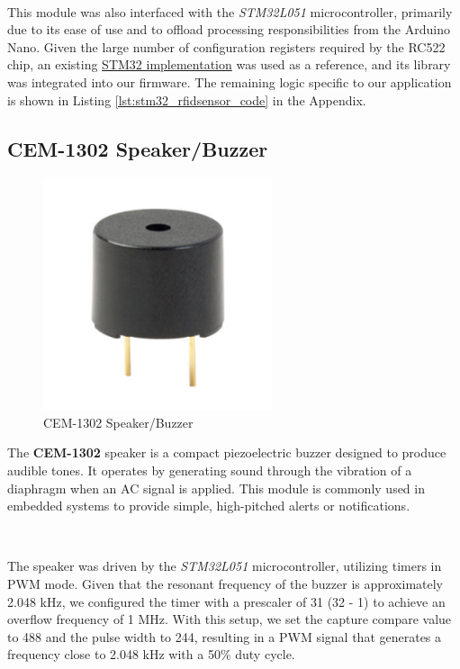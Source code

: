 \documentclass{article}
\begin{document}
\

This module was also interfaced with the \emph{STM32L051} microcontroller, primarily due to its ease of use and to offload processing responsibilities from the Arduino Nano. Given the large number of configuration registers required by the RC522 chip, an existing \href{https://github.com/Hamid-R-Tanhaei/RFID-MIFARE-RC522-ARM-STM32/blob/main/Firmware_stm32f103zct6/Src/MFRC522.c}{STM32 implementation} was used as a reference, and its library was integrated into our firmware. The remaining logic specific to our application is shown in Listing \ref{lst:stm32_rfidsensor_code} in the Appendix.

\subsection{CEM-1302 Speaker/Buzzer}
\label{sec:speaker}
\begin{figure}[H]
    \centering
    \includegraphics[width=0.6\textwidth]{Figures/speaker.png} %
    \caption{CEM-1302 Speaker/Buzzer}
    \label{fig:speaker}


\end{figure}

The \textbf{CEM-1302} speaker is a compact piezoelectric buzzer designed to produce audible tones. It operates by generating sound through the vibration of a diaphragm when an AC signal is applied. This module is commonly used in embedded systems to provide simple, high-pitched alerts or notifications.

\

The speaker was driven by the \emph{STM32L051} microcontroller, utilizing timers in PWM mode. Given that the resonant frequency of the buzzer is approximately 2.048 kHz, we configured the timer with a prescaler of 31 (32 - 1) to achieve an overflow frequency of 1 MHz. With this setup, we set the capture compare value to 488 and the pulse width to 244, resulting in a PWM signal that generates a frequency close to 2.048 kHz with a 50\% duty cycle.
\end{document}

